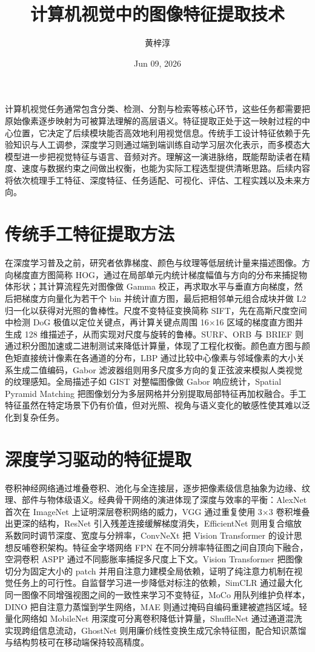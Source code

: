 \title{计算机视觉中的图像特征提取技术}
\author{黄梓淳}
\date{Jun 09, 2026}
\maketitle
计算机视觉任务通常包含分类、检测、分割与检索等核心环节，这些任务都需要把原始像素逐步映射为可被算法理解的高层语义。特征提取正处于这一映射过程的中心位置，它决定了后续模块能否高效地利用视觉信息。传统手工设计特征依赖于先验知识与人工调参，深度学习则通过端到端训练自动学习层次化表示，而多模态大模型进一步把视觉特征与语言、音频对齐。理解这一演进脉络，既能帮助读者在精度、速度与数据约束之间做出权衡，也能为实际工程选型提供清晰思路。后续内容将依次梳理手工特征、深度特征、任务适配、可视化、评估、工程实践以及未来方向。\par
\chapter{传统手工特征提取方法}
在深度学习普及之前，研究者依靠梯度、颜色与纹理等低层统计量来描述图像。方向梯度直方图简称 HOG，通过在局部单元内统计梯度幅值与方向的分布来捕捉物体形状；其计算流程先对图像做 Gamma 校正，再求取水平与垂直方向梯度，然后把梯度方向量化为若干个 bin 并统计直方图，最后把相邻单元组合成块并做 L2 归一化以获得对光照的鲁棒性。尺度不变特征变换简称 SIFT，先在高斯尺度空间中检测 DoG 极值以定位关键点，再计算关键点周围 16×16 区域的梯度直方图并生成 128 维描述子，从而实现对尺度与旋转的鲁棒。SURF、ORB 与 BRIEF 则通过积分图加速或二进制测试来降低计算量，体现了工程化权衡。颜色直方图与颜色矩直接统计像素在各通道的分布，LBP 通过比较中心像素与邻域像素的大小关系生成二值编码，Gabor 滤波器组则用多尺度多方向的复正弦波来模拟人类视觉的纹理感知。全局描述子如 GIST 对整幅图像做 Gabor 响应统计，Spatial Pyramid Matching 把图像划分为多层网格并分别提取局部特征再加权融合。手工特征虽然在特定场景下仍有价值，但对光照、视角与语义变化的敏感性使其难以泛化到复杂任务。\par
\chapter{深度学习驱动的特征提取}
卷积神经网络通过堆叠卷积、池化与全连接层，逐步把像素级信息抽象为边缘、纹理、部件与物体级语义。经典骨干网络的演进体现了深度与效率的平衡：AlexNet 首次在 ImageNet 上证明深层卷积网络的威力，VGG 通过重复使用 3×3 卷积堆叠出更深的结构，ResNet 引入残差连接缓解梯度消失，EfficientNet 则用复合缩放系数同时调节深度、宽度与分辨率，ConvNeXt 把 Vision Transformer 的设计思想反哺卷积架构。特征金字塔网络 FPN 在不同分辨率特征图之间自顶向下融合，空洞卷积 ASPP 通过不同膨胀率捕捉多尺度上下文。Vision Transformer 把图像切分为固定大小的 patch 并用自注意力建模全局依赖，证明了纯注意力机制在视觉任务上的可行性。自监督学习进一步降低对标注的依赖，SimCLR 通过最大化同一图像不同增强视图之间的一致性来学习不变特征，MoCo 用队列维护负样本，DINO 把自注意力蒸馏到学生网络，MAE 则通过掩码自编码重建被遮挡区域。轻量化网络如 MobileNet 用深度可分离卷积降低计算量，ShuffleNet 通过通道混洗实现跨组信息流动，GhostNet 则用廉价线性变换生成冗余特征图，配合知识蒸馏与结构剪枝可在移动端保持较高精度。\par
